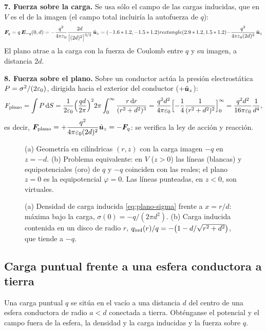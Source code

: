 \documentclass[11pt,a4paper,twoside]{article}
\begin{document}
\begin{resolucion}
\textbf{7. Fuerza sobre la carga.} Se usa sólo el campo de las cargas inducidas, que en $V$
es el de la imagen (el campo total incluiría la autofuerza de $q$):
\begin{equation}\label{eq:plano-Fq}
  \bm{F}_q=q\,\bm{E}_{-q}(0,d)=-\frac{q^{2}}{4\pi\varepsilon_{0}}\frac{2d}{\bigl[(2d)^{2}\bigr]^{3/2}}\,\hat{\bm{u}}_z
  =(-1.6*1.2,-1.5*1.2) rectangle (2.9*1.2,1.5*1.2){-\frac{q^{2}}{4\pi\varepsilon_{0}(2d)^{2}}\,\hat{\bm{u}}_z}
\end{equation}
El plano atrae a la carga con la fuerza de Coulomb entre $q$ y su imagen, a distancia $2d$.

\textbf{8. Fuerza sobre el plano.} Sobre un conductor actúa la presión electrostática
$P=\sigma^{2}/(2\varepsilon_{0})$, dirigida hacia el exterior del conductor ($+\hat{\bm{u}}_z$):
\[
  F_{\mathrm{plano}}=\int P\,\mathrm{d} S=\frac{1}{2\varepsilon_{0}}\Bigl(\frac{q d}{2\pi}\Bigr)^{2}2\pi\int_0^{\infty}\frac{r\,\mathrm{d} r}{(r^{2}+d^{2})^{3}}
  =\frac{q^{2}d^{2}}{4\pi\varepsilon_{0}}\Bigl[-\frac14\frac{1}{(r^{2}+d^{2})^{2}}\Bigr]_0^{\infty}
  =\frac{q^{2}d^{2}}{16\pi\varepsilon_{0}}\frac{1}{d^{4}},
\]
es decir, $\bm{F}_{\mathrm{plano}}=+\dfrac{q^{2}}{4\pi\varepsilon_{0}(2d)^{2}}\hat{\bm{u}}_z=-\bm{F}_q$: se verifica
la ley de acción y reacción.
\end{resolucion}

\begin{figure}[!htb]
  \centering
  
  \caption{(a) Geometría en cilíndricas $(r,z)$ con la carga imagen $-q$ en $z=-d$.
  (b) Problema equivalente: en $V$ ($z>0$) las líneas (blancas) y equipotenciales (oro) de
  $q$ y $-q$ coinciden con las reales; el plano $z=0$ es la equipotencial $\varphi=0$. Las
  líneas punteadas, en $z<0$, son virtuales.}
  \label{fig:plano-imagen}
\end{figure}

\begin{figure}[!htb]
  \centering
  
  \caption{(a) Densidad de carga inducida \eqref{eq:plano-sigma} frente a $x=r/d$: máxima
  bajo la carga, $\sigma(0)=-q/(2\pi d^{2})$. (b) Carga inducida contenida en un disco de radio
  $r$, $q_{\mathrm{ind}}(r)/q=-\bigl(1-d/\sqrt{r^{2}+d^{2}}\bigr)$, que tiende a $-q$.}
  \label{fig:plano-sigma}
\end{figure}

\subsection{Carga puntual frente a una esfera conductora a tierra}

\begin{problema}\label{prob:esfera}
Una carga puntual $q$ se sitúa en el vacío a una distancia $d$ del centro de una esfera
conductora de radio $a<d$ conectada a tierra. Obténganse el potencial y el campo fuera de la
esfera, la densidad y la carga inducidas y la fuerza sobre $q$.
\end{problema}
\end{document}
